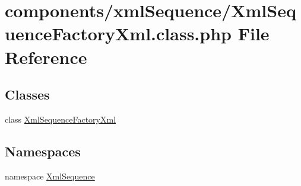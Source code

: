 \hypertarget{_xml_sequence_factory_xml_8class_8php}{
\section{components/xmlSequence/XmlSequenceFactoryXml.class.php File Reference}
\label{_xml_sequence_factory_xml_8class_8php}
}
\subsection*{Classes}
\begin{CompactItemize}
\item 
class \hyperlink{class_xml_sequence_factory_xml}{XmlSequenceFactoryXml}
\end{CompactItemize}
\subsection*{Namespaces}
\begin{CompactItemize}
\item 
namespace \hyperlink{namespace_xml_sequence}{XmlSequence}
\end{CompactItemize}
